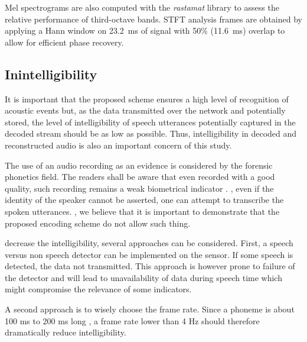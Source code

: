 \documentclass[sensors,article,accept,moreauthors,pdftex,10pt,a4paper]{mdpi}
\begin{document}
Mel spectrograms are also computed with the \textit{rastamat} library \cite{ellis2005} to assess the relative performance of third-octave bands. STFT analysis frames are obtained by applying a Hann window on 23.2~ms of signal with 50\% (11.6~ms) overlap to allow for efficient phase recovery.

\subsection{Inintelligibility} \label{sec:inintelligibility_p}

It is important that the proposed scheme ensures a high level of recognition of acoustic events but, as the data  transmitted over the network and potentially stored, the level of intelligibility of  speech utterances potentially captured in the decoded stream should be as low as possible. Thus, intelligibility in decoded and reconstructed audio is also an important concern of this study.

The use of an audio recording as an evidence is considered by the forensic phonetics \cite{baldwin1990forensic} field. The readers shall be aware that even recorded with a good quality, such recording remains a weak biometrical indicator \cite{boe2000forensic}. , even if the identity of the speaker cannot be asserted, one can attempt to transcribe the spoken utterances. , we believe that it is important to demonstrate that the proposed encoding scheme do not allow such thing.

 decrease the intelligibility, several approaches can be considered. First, a speech versus non speech detector can be implemented on the sensor. If some speech is detected, the data  not transmitted. This approach is however prone to failure of the detector and will lead to unavailability of data during speech time  which might compromise the relevance of some indicators.

A second approach is to wisely choose the frame rate. Since a phoneme is about 100 ms to 200 ms long \cite{kuwabara1996acoustic,rosen1992temporal}, a frame rate lower than 4 Hz should therefore dramatically reduce intelligibility.
\end{document}
